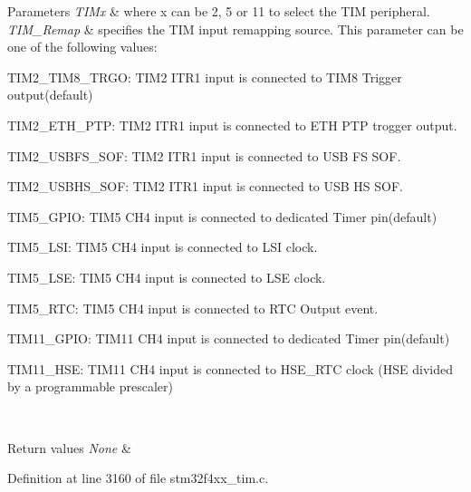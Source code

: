 \begin{DoxyParams}{Parameters}
{\em T\+I\+Mx} & where x can be 2, 5 or 11 to select the T\+IM peripheral. \\
\hline
{\em T\+I\+M\+\_\+\+Remap} & specifies the T\+IM input remapping source. This parameter can be one of the following values\+: \begin{DoxyItemize}
\item T\+I\+M2\+\_\+\+T\+I\+M8\+\_\+\+T\+R\+GO\+: T\+I\+M2 I\+T\+R1 input is connected to T\+I\+M8 Trigger output(default) \item T\+I\+M2\+\_\+\+E\+T\+H\+\_\+\+P\+TP\+: T\+I\+M2 I\+T\+R1 input is connected to E\+TH P\+TP trogger output. \item T\+I\+M2\+\_\+\+U\+S\+B\+F\+S\+\_\+\+S\+OF\+: T\+I\+M2 I\+T\+R1 input is connected to U\+SB FS S\+OF. \item T\+I\+M2\+\_\+\+U\+S\+B\+H\+S\+\_\+\+S\+OF\+: T\+I\+M2 I\+T\+R1 input is connected to U\+SB HS S\+OF. \item T\+I\+M5\+\_\+\+G\+P\+IO\+: T\+I\+M5 C\+H4 input is connected to dedicated Timer pin(default) \item T\+I\+M5\+\_\+\+L\+SI\+: T\+I\+M5 C\+H4 input is connected to L\+SI clock. \item T\+I\+M5\+\_\+\+L\+SE\+: T\+I\+M5 C\+H4 input is connected to L\+SE clock. \item T\+I\+M5\+\_\+\+R\+TC\+: T\+I\+M5 C\+H4 input is connected to R\+TC Output event. \item T\+I\+M11\+\_\+\+G\+P\+IO\+: T\+I\+M11 C\+H4 input is connected to dedicated Timer pin(default) \item T\+I\+M11\+\_\+\+H\+SE\+: T\+I\+M11 C\+H4 input is connected to H\+S\+E\+\_\+\+R\+TC clock (H\+SE divided by a programmable prescaler) \end{DoxyItemize}
\\
\hline
\end{DoxyParams}

\begin{DoxyRetVals}{Return values}
{\em None} & \\
\hline
\end{DoxyRetVals}


Definition at line 3160 of file stm32f4xx\+\_\+tim.\+c.

\mbox{\label{group___t_i_m_ga5273cb65acb885fe7982827b1c6b7d75}} 
